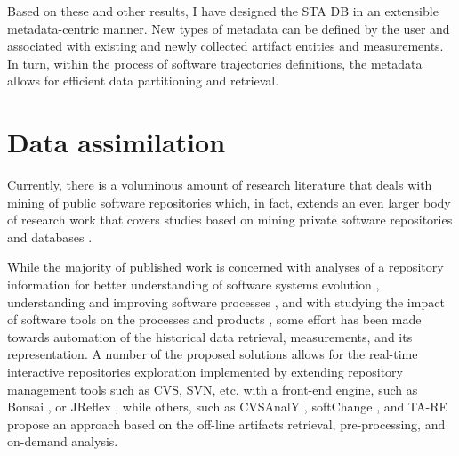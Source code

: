Based on these and other results, I have designed the STA DB in an extensible metadata-centric manner. 
New types of metadata can be defined by the user and associated with existing and newly collected artifact entities 
and measurements. In turn, within the process of software trajectories definitions, the metadata allows for efficient 
data partitioning and retrieval.

\section{Data assimilation}
Currently, there is a voluminous amount of research literature that deals with mining of public software repositories 
\cite{citeulike:2710928} which, in fact, extends an even larger body of research work that covers studies based on mining 
private software repositories and databases \cite{citeulike:393158} \cite{citeulike:13125375} \cite{citeulike:13125481}.

While the majority of published work is concerned with analyses of a repository information 
for better understanding of software systems evolution \cite{citeulike:277045} \cite{citeulike:4000311}, 
understanding and improving software processes \cite{citeulike:5803126}, 
and with studying the impact of software tools on the processes and products \cite{citeulike:13125389},
some effort has been made towards automation of the historical data retrieval, measurements, and its representation. 
A number of the proposed solutions allows for the real-time interactive repositories exploration implemented by extending 
repository management tools such as CVS, SVN, etc. with a front-end engine, such as Bonsai \cite{bonsai},
or JReflex \cite{citeulike:3017440}, while others, such as CVSAnalY \cite{citeulike:6544724}, 
softChange \cite{citeulike:13125395}, and {TA}-{RE} \cite{citeulike:4000311} propose an approach based on 
the off-line artifacts retrieval, pre-processing, and on-demand analysis.

